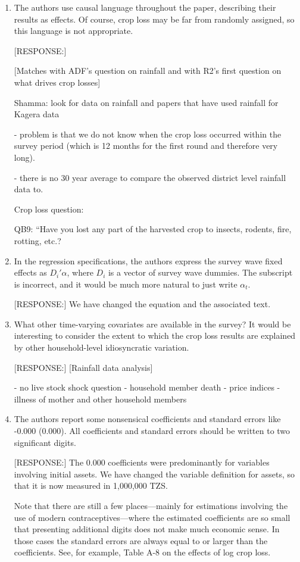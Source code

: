 \documentclass[letterpaper,12pt]{article}
\begin{document}
\begin{enumerate}
\item The authors use causal language throughout the paper, describing
their results as effects. Of course, crop loss may be far from randomly
assigned, so this language is not appropriate.

[RESPONSE:]

[Matches with ADF's question on rainfall and with R2's first question 
on what drives crop losses]

Shamma: look for data on rainfall and papers that have used rainfall
for Kagera data

- problem is that we do not know when the crop loss occurred within
the survey period (which is 12 months for the first round and therefore
very long).

- there is no 30 year average to compare the observed district level
rainfall data to.

Crop loss question:

QB9: ``Have you lost any part of the harvested crop to insects,
rodents, fire, rotting, etc.?


\item In the regression specifications, the authors express the survey
wave fixed effects as $D_{i}'\alpha$, where $D_{i}$ is a vector of survey
wave dummies. The subscript is incorrect, and it would be much more
natural to just write $\alpha_{t}$.

[RESPONSE:] We have changed the equation and the associated text.

\item What other time-varying covariates are available in the survey? It
would be interesting to consider the extent to which the crop loss
results are explained by other household-level idiosyncratic variation.

[RESPONSE:] [Rainfall data analysis]

- no live stock shock question
- household member death
- price indices
- illness of mother and other household members


\item The authors report some nonsensical coefficients and standard
errors like -0.000 (0.000). All coefficients and standard errors should
be written to two significant digits.

[RESPONSE:] The 0.000 coefficients were predominantly for variables
involving initial assets. 
We have changed the variable definition for assets, so that it is
now measured in 1,000,000 TZS. 

Note that there are still a few places---mainly for estimations
involving the use of modern contraceptives---where the estimated 
coefficients are so small that presenting additional digits does not make
much economic sense.
In those cases the standard errors are always equal to or larger than
the coefficients.
See, for example, Table A-8 on the effects of log crop loss.



\end{enumerate}
\end{document}
